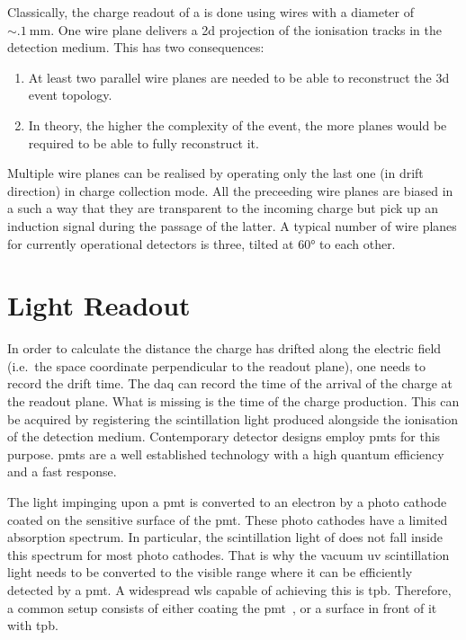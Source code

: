 Classically, the charge readout of a \lartpc{} is done using wires with a diameter of $\sim{\SI{.1}{\milli\metre}}$.
One wire plane delivers a \gls{2d} projection of the ionisation tracks in the detection medium.
This has two consequences:
\begin{enumerate}
	\item At least two parallel wire planes are needed to be able to reconstruct the \gls{3d} event topology.
	\item In theory, the higher the complexity of the event, the more planes would be required to be able to fully reconstruct it.
\end{enumerate}
Multiple wire planes can be realised by operating only the last one (in drift direction) in charge collection mode.
All the preceeding wire planes are biased in a such a way that they are transparent to the incoming charge but pick up an induction signal during the passage of the latter.
A typical number of wire planes for currently operational detectors is three, tilted at \ang{60} to each other.


\section{Light Readout}
\label{sec:lartpc_light-ro}

In order to calculate the distance the charge has drifted along the electric field (i.e.\ the space coordinate perpendicular to the readout plane), one needs to record the drift time.
The \gls{daq} can record the time of the arrival of the charge at the readout plane.
What is missing is the time of the charge production.
This can be acquired by registering the scintillation light produced alongside the ionisation of the detection medium.
Contemporary detector designs employ \glspl{pmt} for this purpose.
\glspl{pmt} are a well established technology with a high quantum efficiency and a fast response.

The light impinging upon a \gls{pmt} is converted to an electron by a photo cathode coated on the sensitive surface of the \gls{pmt}.
These photo cathodes have a limited absorption spectrum.
In particular, the scintillation light of \lar{} does not fall inside this spectrum for most photo cathodes.
That is why the vacuum \gls{uv} scintillation light needs to be converted to the visible range where it can be efficiently detected by a \gls{pmt}.
A widespread \gls{wls} capable of achieving this is \gls{tpb}.
Therefore, a common setup consists of either coating the \gls{pmt}~\cite{icarus}, or a surface in front of it~\cite{uboone} with \gls{tpb}.


